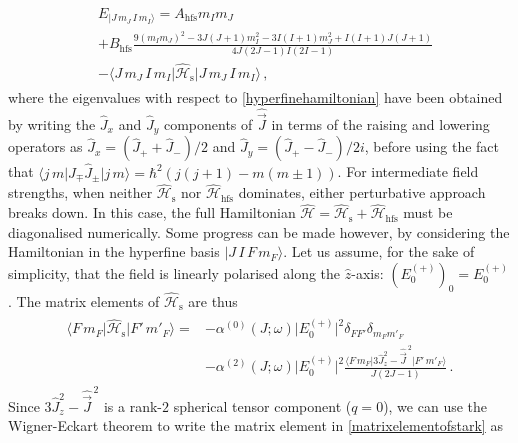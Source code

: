 \documentclass[../Thesis-IJspeert.tex]{subfiles}
\begin{document}
\begin{align}
\begin{split}
	&E_{\vert J\, m_J\, I\, m_I\rangle}= A_{\text{hfs}} m_I m_J \\&+B_{\text{hfs}}\frac{9(m_I m_J)^2-3J(J+1)m_I^2 - 3I(I+1)m_J^2 + I(I+1)J(J+1)}{4J(2J-1)I(2I-1)} \\&- \langle J\, m_J\, I\, m_I \vert \hat{\mathcal{H}}_{\text{s}} \vert J\, m_J\, I\, m_I\rangle \,,
\end{split}
\end{align}
where the eigenvalues with respect to \autoref{hyperfinehamiltonian} have been obtained by writing the $\hat{J}_x$ and $\hat{J}_y$ components of $\hat{\vec{J}}$ in terms of the raising and lowering operators as $\hat{J}_x=(\hat{J}_+ + \hat{J}_-)/2$ and $\hat{J}_y=(\hat{J}_+ - \hat{J}_-)/2i$, before using the fact that $\langle j\, m \vert \hat{J}_\mp \hat{J}_\pm \vert j\, m \rangle = \hbar^2\left( j(j+1) - m(m\pm1)\right)$. For intermediate field strengths, when neither $\hat{\mathcal{H}}_\text{s}$ nor $\hat{\mathcal{H}}_\text{hfs}$ dominates, either perturbative approach breaks down. In this case, the full Hamiltonian $\hat{\mathcal{H}}=\hat{\mathcal{H}}_\text{s}+\hat{\mathcal{H}}_\text{hfs}$ must be diagonalised numerically. Some progress can be made however, by considering the Hamiltonian in the hyperfine basis $\vert J\, I\, F\, m_F\rangle$. Let us assume, for the sake of simplicity, that the field is linearly polarised along the $\hat{z}$-axis: $(E_0^{(+)})_0=E_0^{(+)}$. The matrix elements of $\hat{\mathcal{H}}_\text{s}$ are thus
\begin{align}
\label{matrixelementofstark}
\begin{split}
\langle F\,m_F \vert \hat{\mathcal{H}}_\text{s} \vert F'\, m'_F \rangle = &- \alpha^{(0)}\left(J;\omega\right) \lvert E_0^{(+)}\rvert ^2 \delta_{FF'}\delta_{m_F m'_F} \\&- \alpha^{(2)}\left(J;\omega\right) \lvert E_0^{(+)}\rvert ^2 \frac{ \langle F\,m_F \vert 3{\hat{J}}_z^2-\hat{\vec{J}}^{\,2}  \vert F'\, m'_F \rangle }{J\left(2J-1\right)} \,.
\end{split}
\end{align}
Since $3{\hat{J}}_z^2-\hat{\vec{J}}^{\,2}$ is a rank-$2$ spherical tensor component ($q=0$), we can use the Wigner-Eckart theorem to write the matrix element in \autoref{matrixelementofstark} as
\end{document}
